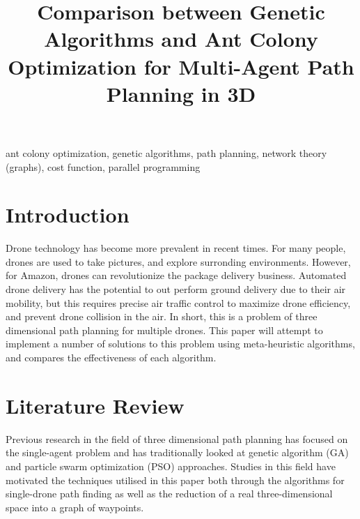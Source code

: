 \documentclass[conference]{IEEEtran}
\begin{document}
\title{Comparison between Genetic Algorithms and Ant Colony Optimization for Multi-Agent Path Planning in 3D}

\author{
\and
{}
\and
{}
\and
{}
\and
{}
\and
{}
}

\maketitle

\begin{abstract}
\blindtext
\end{abstract}

\begin{IEEEkeywords}
ant colony optimization, genetic algorithms, path planning, network theory (graphs), cost function, parallel programming
\end{IEEEkeywords}

\section{Introduction}
Drone technology has become more prevalent in recent times. For many people, drones are used to take pictures, and explore surronding environments. However, for Amazon, drones can revolutionize the package delivery business. Automated drone delivery has the potential to out perform ground delivery due to their air mobility, but this requires precise air traffic control to maximize drone efficiency, and prevent drone collision in the air. In short, this is a problem of three dimensional path planning for multiple drones. This paper will attempt to implement a number of solutions to this problem using meta-heuristic algorithms, and compares the effectiveness of each algorithm.

\section{Literature Review}
Previous research in the field of three dimensional path planning has focused on the single-agent problem and has traditionally looked at genetic algorithm (GA) and particle swarm optimization (PSO) approaches. Studies in this field have motivated the techniques utilised in this paper both through the algorithms for single-drone path finding as well as the reduction of a real three-dimensional space into a graph of waypoints.
\end{document}
